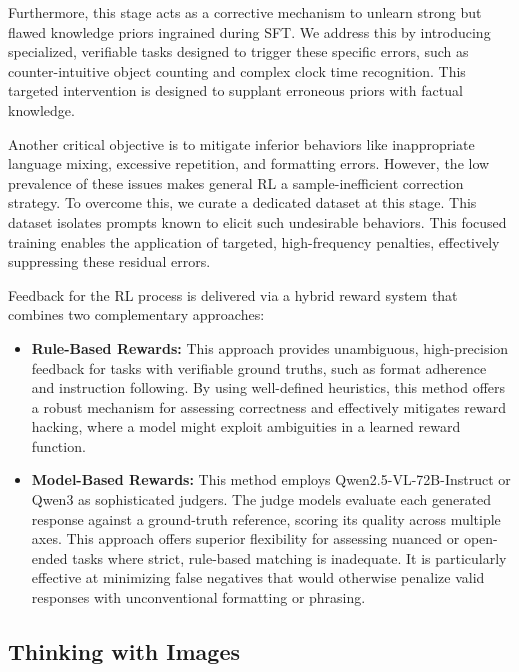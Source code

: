 \documentclass{article} %
\begin{document}
Furthermore, this stage acts as a corrective mechanism to unlearn strong but flawed knowledge priors ingrained during SFT. We address this by introducing specialized, verifiable tasks designed to trigger these specific errors, such as counter-intuitive object counting and complex clock time recognition. This targeted intervention is designed to supplant erroneous priors with factual knowledge.

Another critical objective is to mitigate inferior behaviors like inappropriate language mixing, excessive repetition, and formatting errors. However, the low prevalence of these issues makes general RL a sample-inefficient correction strategy. To overcome this, we curate a dedicated dataset at this stage. This dataset isolates prompts known to elicit such undesirable behaviors. This focused training enables the application of targeted, high-frequency penalties, effectively suppressing these residual errors.

Feedback for the RL process is delivered via a hybrid reward system that combines two complementary approaches:

\begin{itemize}[itemindent=0pt, labelsep=4pt, leftmargin=*]
\item \textbf{Rule-Based Rewards:} This approach provides unambiguous, high-precision feedback for tasks with verifiable ground truths, such as format adherence and instruction following. By using well-defined heuristics, this method offers a robust mechanism for assessing correctness and effectively mitigates reward hacking, where a model might exploit ambiguities in a learned reward function.

\item \textbf{Model-Based Rewards:} This method employs Qwen2.5-VL-72B-Instruct or Qwen3 as sophisticated judgers. The judge models evaluate each generated response against a ground-truth reference, scoring its quality across multiple axes. This approach offers superior flexibility for assessing nuanced or open-ended tasks where strict, rule-based matching is inadequate. It is particularly effective at minimizing false negatives that would otherwise penalize valid responses with unconventional formatting or phrasing.

\end{itemize}

\subsection{Thinking with Images}
\end{document}
